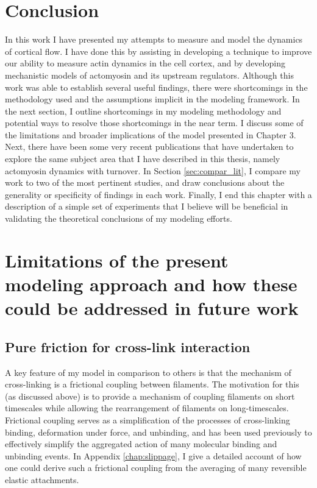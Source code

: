 
\section{Conclusion}
In this work I have presented my attempts to measure and model the dynamics of cortical flow. I have done this by assisting in developing a technique to improve our ability to measure actin dynamics in the cell cortex, and by developing mechanistic models of actomyosin and its upstream regulators. Although this work was able to establish several useful findings, there were shortcomings in the methodology used and the assumptions implicit in the modeling framework.  In the next section, I outline shortcomings in my modeling methodology and potential ways to resolve those shortcomings in the near term. I discuss some of the limitations and broader implications of the model presented in Chapter 3. Next, there have been some very recent publications that have undertaken to explore the same subject area that I have described in this thesis, namely actomyosin dynamics with turnover.  In Section \ref{sec:compar_lit}, I compare my work to two of the most pertinent studies, and draw conclusions about the generality or specificity of findings in each work.  Finally, I end this chapter with a description of a simple set of experiments that I believe will be beneficial in validating the theoretical conclusions of my modeling efforts.



\section{Limitations of the present modeling approach and how these could be addressed in future work}

\subsection{Pure friction for cross-link interaction}
A key feature of my model in comparison to others is that the mechanism of cross-linking is a frictional coupling between filaments.  The motivation for this (as discussed above) is to provide a mechanism of coupling filaments on short timescales while allowing the rearrangement of filaments on long-timescales.  Frictional coupling serves as a simplification of the processes of cross-linking binding, deformation under force, and unbinding, and has been used previously \cite{theo_friction,theo_frictionSam,theo_molefric,mol_fric,theo_hydroish2,theo_frictionShila} to effectively simplify the aggregated action of many molecular binding and unbinding events. In Appendix \ref{chap:slippage}, I give a detailed account of how one could derive such a frictional coupling from the averaging of many reversible elastic attachments.  

